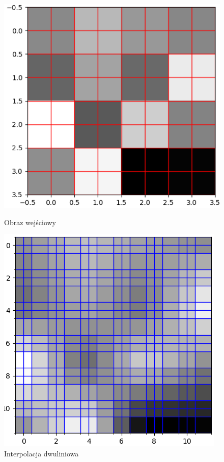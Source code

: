 \begin{figure}[ht]
    \centering
    \begin{minipage}[t]{0.3\linewidth}
        \includegraphics[width=\linewidth]{Rozdziały/02.Podstawy_teoretyczne/bilinear_original.png}
        \caption{Obraz wejściowy}
        \label{fig:image7}
    \end{minipage}
    \hspace{0.5cm}
    \begin{minipage}[t]{0.3\linewidth}
        \includegraphics[width=\linewidth]{Rozdziały/02.Podstawy_teoretyczne/bilinear_enlarged.png}
        \caption{Interpolacja dwuliniowa}
        \label{fig:image8}
    \end{minipage}
\end{figure}

